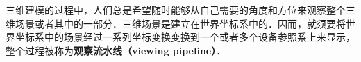 

三维建模的过程中，人们总是希望随时能够从自己需要的角度和方位来观察整个三维场景或者其中的一部分．三维场景是建立在世界坐标系中的．因而，就须要将世界坐标系中的场景经过一系列坐标变换变换到一个或者多个设备参照系上来显示，整个过程被称为\textbf{观察流水线（viewing pipeline）}． 